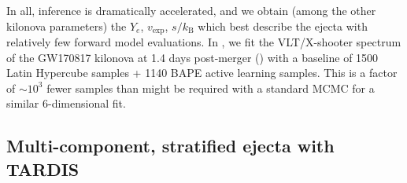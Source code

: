 \documentclass[twocolumn, twocolappendix]{aastex63}
\begin{document}
In all, inference is dramatically accelerated, and we obtain (among the other kilonova parameters) the $Y_e$, $v_{\mathrm{exp}}$, $s / k_{\mathrm{B}}$ which best describe the ejecta with relatively few forward model evaluations. In \cite{vieira23}, we fit the VLT/X-shooter spectrum of the GW170817 kilonova at 1.4 days post-merger (\citealt{pian17, smartt17}) with a baseline of 1500 Latin Hypercube samples + 1140 BAPE active learning samples. This is a factor of $\sim 10^3$ fewer samples than might be required with a standard MCMC for a similar 6-dimensional fit.


\subsection{Multi-component, stratified ejecta with \textsc{TARDIS}}\label{ssc:multi-component-TARDIS}
\end{document}
